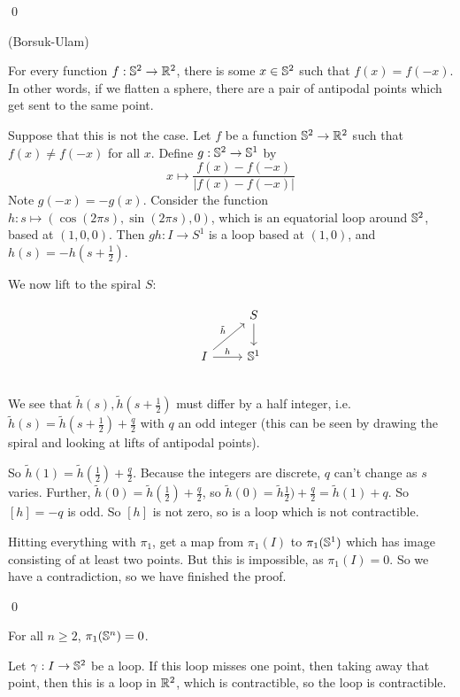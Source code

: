 \documentclass[x11names,reqno,14pt]{extarticle}
\begin{document}
\qed

\thm (Borsuk-Ulam)

For every function $f:\mathbb{S}^2\to\mathbb{R}^2$, there is some $x \in \mathbb{S}^2$ such that $f(x) = f(-x)$. In other words, if we flatten a sphere, there are a pair of antipodal points which get sent to the same point. 

\proof

Suppose that this is not the case. Let $f$ be a function $\mathbb{S}^2\to\mathbb{R}^2$ such that $f(x)\neq f(-x)$ for all $x$. Define $g:\mathbb{S}^2\to\mathbb{S}^1$ by 
\[
x\mapsto \frac{f(x) - f(-x)}{|f(x) - f(-x)|}
\]
Note $g(-x) = -g(x)$. Consider the function $h:s\mapsto(\cos(2\pi s), \sin(2\pi s), 0)$, which is an equatorial loop around $\mathbb{S}^2$, based at $(1, 0, 0)$. Then $gh:I\to S^1$ is a loop based at $(1, 0)$, and $h(s) = - h(s + \frac{1}{2})$. 

We now lift to the spiral $S$:

\[
\begin{tikzcd}
& S \ar[d]\\
I\ar[ur, "\tilde{h}"] \ar[r, "h"] & \mbb{S}^1\\
\end{tikzcd}
\]
We see that $\tilde{h}(s), \tilde{h}(s + \frac{1}{2})$ must differ by a half integer, i.e. $\tilde{h}(s) = \tilde{h}(s + \frac{1}{2}) + \frac{q}{2}$ with $q$ an odd integer (this can be seen by drawing the spiral and looking at lifts of antipodal points). 

So $\tilde{h}(1) = \tilde{h}(\frac{1}{2}) + \frac{q}{2}$. Because the integers are discrete, $q$ can't change as $s$ varies. Further, $\tilde{h}(0) = \tilde{h}(\frac{1}{2}) + \frac{q}{2}$, so $\tilde{h}(0) = \tilde{h}\frac{1}{2}) + \frac{q}{2} = \tilde{h}(1) + q$. So $[h] = -q$ is odd. So $[h]$ is not zero, so is a loop which is not contractible. 

Hitting everything with $\pi_1$, get a map from $\pi_1(I)$ to $\pi_1(\mathbb{S}^1)$ which has image consisting of at least two points. But this is impossible, as $\pi_1(I) = 0$. So we have a contradiction, so we have finished the proof. 

\qed

\prop

For all $n \geq 2$, $\pi_1(\mathbb{S}^n) = 0$. 

\proof

Let $\gamma:I\to\mathbb{S}^2$ be a loop. If this loop misses one point, then taking away that point, then this is a loop in $\mathbb{R}^2$, which is contractible, so the loop is contractible. 
 
\end{document}
